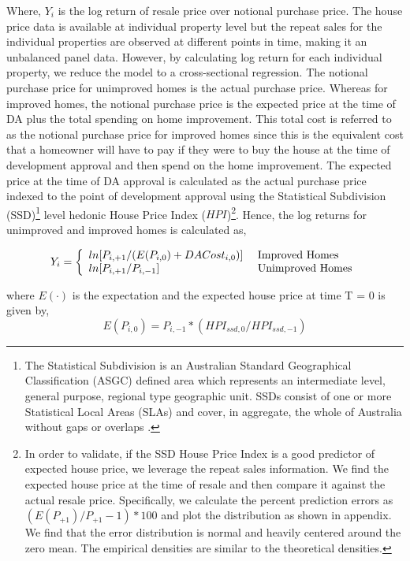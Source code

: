 \documentclass[AEJ,reqno, draftmode]{AEA} %
\begin{document}
Where, $Y_i$ is the log return of resale price over notional purchase price. The house price data is available at individual property level but the repeat sales for the individual properties are observed at different points in time, making it an unbalanced panel data. However, by calculating log return for each individual property, we reduce the model to a cross-sectional regression. The notional purchase price for unimproved homes is the actual purchase price. Whereas for improved homes, the notional purchase price is the expected price at the time of DA plus the total spending on home improvement. This total cost is referred to as the notional purchase price for improved homes since this is the equivalent cost that a homeowner will have to pay if they were to buy the house at the time of development approval and then spend on the home improvement. The expected price at the time of DA approval is calculated as the actual purchase price indexed to the point of development approval using the Statistical Subdivision (SSD)\footnote{The Statistical Subdivision is an Australian Standard Geographical Classification (ASGC) defined area which represents an intermediate level, general purpose, regional type geographic unit. SSDs consist of one or more Statistical Local Areas (SLAs) and cover, in aggregate, the whole of Australia without gaps or overlaps \citep{SSD}.} level hedonic House Price Index ($HPI$)\footnote{In order to validate, if the SSD House Price Index is a good predictor of expected house price, we leverage the repeat sales information. We find the expected house price at the time of resale and then compare it against the actual resale price. Specifically, we calculate the percent prediction errors as $(E(P_{+1})/P_{+1} -1)*100$ and plot the distribution as shown in appendix. We find that the error distribution is normal and heavily centered around the zero mean. The empirical densities are similar to the theoretical densities.}. Hence, the log returns for unimproved and improved homes is calculated as,

\begin{equation}
    Y_i = \left\{
    \begin{array}{l l}
      ln[P_{i,+1}/(E(P_{i,0})+ DACost_{i,0})] & \text{ Improved Homes}\\
      ln[P_{i,+1}/P_{i,-1}] & \text{ Unimproved Homes} \\
    \end{array} \right.
\end{equation}

where $E(\cdot)$ is the expectation and the expected house price at time T = 0 is given by, \begin{equation}
    E(P_{i,0}) = P_{i,-1} * (HPI_{ssd,0} / HPI_{ssd,-1})
\end{equation}
\end{document}
